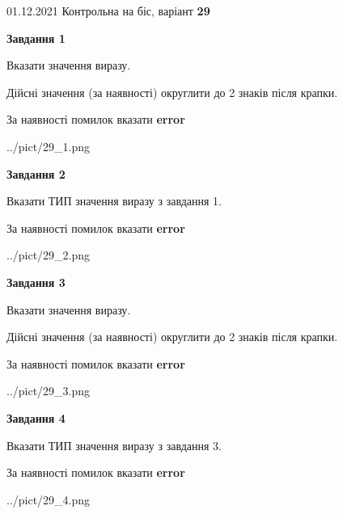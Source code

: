 \documentclass[11pt, ukrainian]{article}
\begin{document}
{01.12.2021 Контрольна на біс, варіант  \No \textbf { 29 }\par}
{
\begin {large}
{\begin {center}\textbf{Завдання 1}\end {center}}\par
Вказати значення виразу. \par
Дійсні значення (за наявності) округлити до 2 знаків після крапки. \par
За наявності помилок вказати \textbf{error}

\begin{center}
	{../pict/29_1.png}
\end{center}
\newpage

{\begin {center}\textbf{Завдання 2}\end {center}}\par
Вказати ТИП значення виразу з завдання 1. \par
За наявності помилок вказати \textbf{error}

\begin{center}
	{../pict/29_2.png}
\end{center}
\newpage

{\begin {center}\textbf{Завдання 3}\end {center}}\par
Вказати значення виразу. \par
Дійсні значення (за наявності) округлити до 2 знаків після крапки. \par
За наявності помилок вказати \textbf{error}

\begin{center}
	{../pict/29_3.png}
\end{center}
\newpage

{\begin {center}\textbf{Завдання 4}\end {center}}\par
Вказати ТИП значення виразу з завдання 3. \par
За наявності помилок вказати \textbf{error}

\begin{center}
	{../pict/29_4.png}
\end{center}
\newpage


\end{large}}
\end{document}
